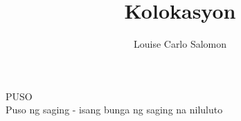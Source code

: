 \documentclass{article}
\title{Kolokasyon}
\author{Louise Carlo Salomon}
\date{}
\begin{document}
    \maketitle
    PUSO \\ \>\>\>\>\>\> Puso ng saging - isang bunga ng saging na niluluto \\
\end{document}
